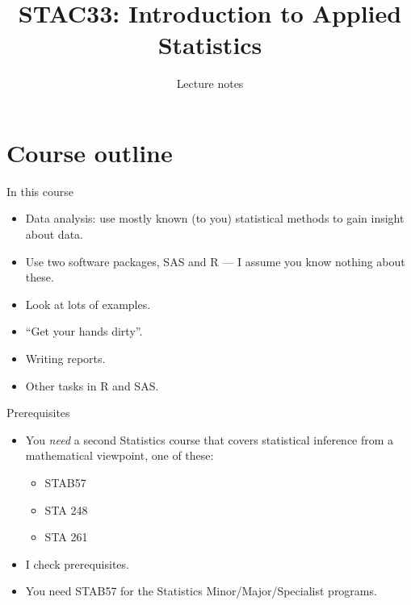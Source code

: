 \documentclass[
  ignorenonframetext,
]{beamer}
\title{STAC33: Introduction to Applied Statistics}
\author{Lecture notes}
\date{}
\providecommand{\tightlist}{%
  \setlength{\itemsep}{0pt}\setlength{\parskip}{0pt}}
\begin{document}
\frame{\titlepage}

\hypertarget{course-outline}{%
\section{Course outline}\label{course-outline}}

\begin{frame}{In this course}
\protect\hypertarget{in-this-course}{}

\begin{itemize}
\tightlist
\item
  Data analysis: use mostly known (to you) statistical methods to gain
  insight about data.
\item
  Use two software packages, SAS and R --- I assume you know nothing
  about these.
\item
  Look at lots of examples.
\item
  ``Get your hands dirty''.
\item
  Writing reports.
\item
  Other tasks in R and SAS.
\end{itemize}

\end{frame}

\begin{frame}{Prerequisites}
\protect\hypertarget{prerequisites}{}

\begin{itemize}
\tightlist
\item
  You \emph{need} a second Statistics course that covers statistical
  inference from a mathematical viewpoint, one of these:

  \begin{itemize}
  \tightlist
  \item
    STAB57
  \item
    STA 248
  \item
    STA 261
  \end{itemize}
\item
  I check prerequisites.
\item
  You need STAB57 for the Statistics Minor/Major/Specialist programs.
\end{itemize}

\end{frame}
\end{document}
